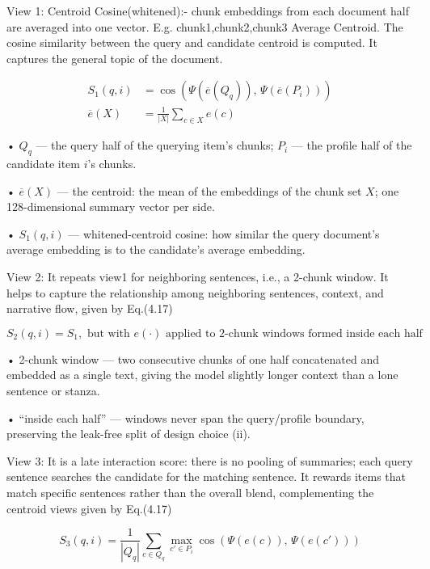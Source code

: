 View 1: Centroid Cosine(whitened):- chunk embeddings from each document half are averaged into one vector. E.g. chunk1,chunk2,chunk3  Average  Centroid. The cosine similarity between the query and candidate centroid is computed. It captures the general topic of the document.

\begin{equation}
  \begin{aligned}
  S_{1}(q, i) &= \cos\!\left( \Psi\!\left( \overline{e}(Q_{q}) \right), \, \Psi\!\left( \overline{e}(P_{i}) \right) \right) \\
  \overline{e}(X) &= \frac{1}{|X|} \sum_{c \in X} e(c)
  \end{aligned}
  \label{eq:ch4_4_16}
\end{equation}

• $Q_q$ --- the query half of the querying item's chunks; $P_i$ --- the profile half of the candidate item $i$'s chunks.

• $\overline{e}(X)$ --- the centroid: the mean of the embeddings of the chunk set $X$; one 128-dimensional summary vector per side.

• $S_1(q, i)$ --- whitened-centroid cosine: how similar the query document's average embedding is to the candidate's average embedding.

View 2: It repeats view1 for neighboring sentences, i.e., a 2-chunk window. It helps to capture the relationship among neighboring sentences, context, and narrative flow, given by Eq.(4.17)

\begin{equation}
  S_{2}(q, i) = S_{1}, \text{ but with } e(\cdot) \text{ applied to 2-chunk windows formed inside each half}
  \label{eq:ch4_4_17}
\end{equation}

• 2-chunk window --- two consecutive chunks of one half concatenated and embedded as a single text, giving the model slightly longer context than a lone sentence or stanza.

• “inside each half” --- windows never span the query/profile boundary, preserving the leak-free split of design choice (ii).

View 3: It is a late interaction score: there is no pooling of summaries; each query sentence searches the candidate for the matching sentence. It rewards items that match specific sentences rather than the overall blend, complementing the centroid views given by Eq.(4.17)

\begin{equation}
  S_{3}(q, i) = \frac{1}{|Q_{q}|} \sum_{c \in Q_{q}} \max_{c' \in P_{i}} \cos\left( \Psi(e(c)), \, \Psi(e(c')) \right)
  \label{eq:ch4_4_18}
\end{equation}


